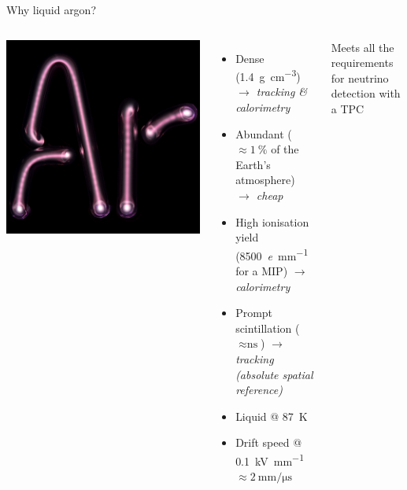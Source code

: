 \documentclass[]{beamer}
\newcommand*{\emphcol}{blue}
\begin{document}
\begin{frame}{Why liquid argon?}
	\begin{columns}[c]
		\centering
		\includegraphics[width=\textwidth]{defence/ArTube}
		\begin{itemize}
			\item Dense (\SI{1.4}{\gram\per\cubic\centi\metre}) \emph{$\rightarrow$ tracking \& calorimetry}
			\item Abundant ($\approx \SI{1}{\percent}$ of the Earth's atmosphere) \emph{$\rightarrow$ cheap}
			\item High ionisation yield (\SI{8500}{\elementarycharge\per\milli\metre} for a MIP) \emph{$\rightarrow$ calorimetry}
			\item Prompt scintillation ($\approx \si{\nano\second}$) \emph{$\rightarrow$ tracking (absolute spatial reference)}
			\item Liquid @ \SI{87}{\kelvin}
			\item Drift speed @ \SI{0.1}{\kilo\volt\per\milli\meter} $\approx \SI{2}{\milli\meter\per\micro\second}$
		\end{itemize}
		{\color{\emphcol} Meets all the requirements for neutrino detection with a TPC}
	\end{columns}
\end{frame}
\end{document}
